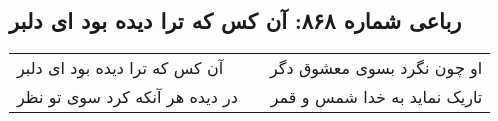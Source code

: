\begin{center}
\section*{رباعی شماره ۸۶۸: آن کس که ترا دیده بود ای دلبر}
\label{sec:0868}
\begin{longtable}{l p{0.5cm} r}
آن کس که ترا دیده بود ای دلبر
&&
او چون نگرد بسوی معشوق دگر
\\
در دیده هر آنکه کرد سوی تو نظر
&&
تاریک نماید به خدا شمس و قمر
\\
\end{longtable}
\end{center}
